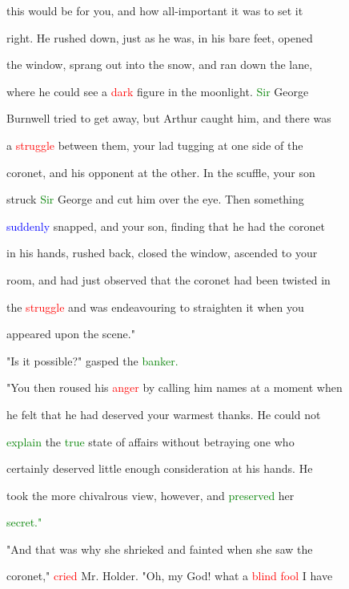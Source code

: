  this would be for you, and how all-important it was to set it

 right. He rushed down, just as he was, in his bare feet, opened

 the window, sprang out into the snow, and ran down the lane,

 where he could see a \textcolor{red}{dark} figure in the moonlight. \textcolor{green}{Sir} George

 Burnwell tried to get away, but Arthur caught him, and there was

 a \textcolor{red}{struggle} between them, your lad tugging at one side of the

 coronet, and his \textcolor{BurntOrange}{opponent} at the other. In the scuffle, your son

 struck \textcolor{green}{Sir} George and cut him over the eye. Then something

 \textcolor{blue}{suddenly} snapped, and your son, finding that he had the coronet

 in his hands, rushed back, closed the window, ascended to your

 room, and had just observed that the coronet had been twisted in

 the \textcolor{red}{struggle} and was endeavouring to straighten it when you

 appeared upon the scene."



 "Is it possible?" gasped the \textcolor{green}{banker.}



 "You then roused his \textcolor{red}{anger} by calling him names at a moment when

 he felt that he had \textcolor{BurntOrange}{deserved} your warmest thanks. He could not

 \textcolor{green}{explain} the \textcolor{green}{true} state of affairs without betraying one who

 certainly \textcolor{BurntOrange}{deserved} little enough consideration at his hands. He

 took the more chivalrous view, however, and \textcolor{green}{preserved} her

 \textcolor{green}{secret."}



 "And that was why she \textcolor{BurntOrange}{shrieked} and fainted when she saw the

 coronet," \textcolor{red}{cried} Mr. Holder. "Oh, my \textcolor{BurntOrange}{God!} what a \textcolor{red}{blind} \textcolor{red}{fool} I have

